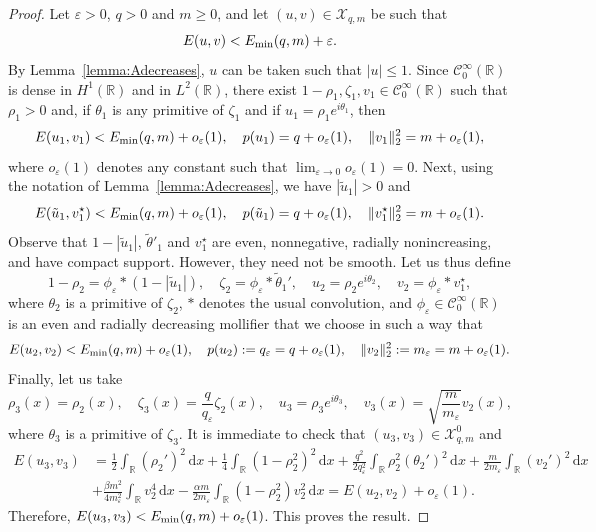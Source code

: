 \documentclass[11pt]{article}
\newcommand{\R}{\mathbb{R}}
\newcommand{\boC}{\mathcal{C}}
\newcommand{\boX}{\mathcal{X}}
\newcommand{\Emin}{E_\textup{min}}
\renewcommand{\d}{\,\mathrm{d}}
\theoremstyle{plain}
\theoremstyle{definition}
\theoremstyle{remark}
\numberwithin{equation}{section}
\begin{document}
{\begin{proof}
    Let $\varepsilon>0$, $q>0$ and $m\geq 0$, and let $(u,v)\in \boX_{q,m}$ be such that
    \[E(u,v)<\Emin(q,m)+\varepsilon.\]
    By Lemma~\ref{lemma:Adecreases}, $u$ can be taken such that $|u|\leq 1$. Since $\boC_0^\infty(\R)$ is dense in $H^1(\R)$ and in $L^2(\R)$, there exist $1-\rho_1,\zeta_1,v_1\in \boC_0^\infty(\R)$ such that $\rho_1>0$ and, if $\theta_1$ is any primitive of $\zeta_1$ and if $u_1=\rho_1 e^{i\theta_1}$, then
    \[E(u_1,v_1)<\Emin(q,m)+o_\varepsilon(1),\quad p(u_1)=q + o_\varepsilon(1),\quad \|v_1\|^2_2=m+o_\varepsilon(1),\]
    where  $o_\varepsilon(1)$ denotes any constant such that $\lim_{\varepsilon\to 0}o_\varepsilon(1)=0$. Next, using the notation of Lemma~\ref{lemma:Adecreases}, we have $|\tilde u_1|>0$ and
    \[E(\tilde u_1,v_1^\star)<\Emin(q,m)+o_\varepsilon(1),\quad p(\tilde u_1)=q+o_\varepsilon(1),\quad \|v_1^\star\|^2_2=m+o_\varepsilon(1).\]
    Observe that $1-|\tilde u_1|$, $\tilde\theta'_1$ and $v_1^\star$ are even, nonnegative, radially nonincreasing, and have compact support. However, they need not be smooth. Let us thus define
    \[1-\rho_2=\phi_\varepsilon*(1-|\tilde u_1|),\quad \zeta_2=\phi_\varepsilon*\tilde\theta_1',\quad u_2=\rho_2 e^{i\theta_2},\quad v_2=\phi_\varepsilon*v_1^\star,\]
    where $\theta_2$ is a primitive of $\zeta_2$,  $*$ denotes the usual convolution, and $\phi_\varepsilon \in\boC^\infty_0(\R)$ is an even and radially decreasing mollifier that we choose in such a way that
    \[E(u_2,v_2)<\Emin(q,m)+o_\varepsilon(1),\quad p(u_2):=q_\varepsilon=q+o_\varepsilon(1),\quad \|v_2\|^2_2:=m_\varepsilon=m+o_\varepsilon(1).\]
    Finally, let us take
     \[\rho_3(x)=\rho_2(x),\quad \zeta_3(x)=\frac{q}{q_\varepsilon}
     \zeta_2(x),\quad u_3=\rho_3 e^{i\theta_3},\quad v_3(x)=\sqrt{\frac{m}{m_\varepsilon}} v_2(x),\]
     where $\theta_3$ is a primitive of $\zeta_3$. It is immediate to check that $(u_3,v_3)\in \boX_{q,m}^0$ and
     \begin{align*}
         E(u_3,v_3)&=\frac12\int_\R(\rho_2')^2\d x + \frac14\int_\R (1-\rho_2^2)^2\d x +\frac{q^2}{2q_\varepsilon^2}\int_\R\rho_2^2(\theta_2')^2\d x+ \frac{m}{2m_\varepsilon}\int_\R(v_2')^2\d x
         \\
         &+\frac{\beta m^2}{4m_\varepsilon^2}\int_\R v_2^4 \d x -\frac{\alpha m}{2m_\varepsilon}\int_\R(1-\rho_2^2)v_2^2\d x=E(u_2,v_2)+o_\varepsilon(1).
     \end{align*}
    Therefore, $E(u_3,v_3)<\Emin(q,m)+o_\varepsilon(1)$. This proves the result. 
\end{proof}




}
\end{document}
